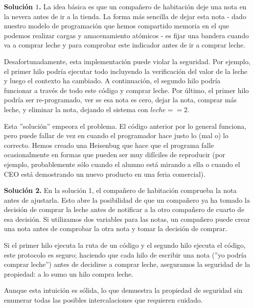 \documentclass[10pt]{book}
\begin{document}
\textbf{Solución $1$.} La idea básica es que un compañero de habitación deje una nota en la nevera antes de ir a la tienda. La forma más sencilla de dejar esta nota - dado nuestro modelo de programación que hemos compartido memoria en el que podemos realizar cargas y amacenamiento atómicos - es fijar una bandera cuando va a comprar leche y para comprobar este indicador antes de ir a comprar leche.

Desafortunadamente, esta implementación puede violar la seguridad. Por ejemplo, el primer hilo podría ejecutar todo incluyendo la verificación del valor de la leche y luego el contexto ha cambiado. A continuación, el segundo hilo podría funcionar a través de todo este código y comprar leche. Por último, el primer hilo podría ser re-programado, ver se esa nota es cero, dejar la nota, comprar más leche, y eliminar la nota, dejando el sistema con $leche == 2$.

Esta ''solución'' empeora el problema. El código anterior por lo general funciona, pero puede fallar de vez en cuando el programador hace justo lo (mal o) lo correcto. Hemos creado una Heisenbug que hace que el programa falle ocasionalmente en formas que pueden ser muy difíciles de reproducir (por ejemplo, probablemente sólo cuando el alumno está mirando a ella o cuando el CEO está demostrando un nuevo producto en una feria comercial).

\textbf{Solución 2.} En la solución 1, el compañero de habitación comprueba la nota antes de ajustarla. Esto abre la posibilidad de que un compañero ya ha tomado la decisión de comprar la leche antes de notificar a la otro compañero de cuarto de esa decisión. Si utilizamos dos variables para las notas, un compañero puede crear una nota antes de comprobar la otra nota y tomar la decisión de comprar.

Si el primer hilo ejecuta la ruta de un código y el segundo hilo ejecuta el código, este protocolo es seguro; haciendo que cada hilo de escribir una nota (''yo podría comprar leche'') antes de decidirse a comprar leche, aseguramos la seguridad de la propiedad: a lo sumo un hilo compra leche.

Aunque esta intuición es sólida, lo que demuestra la propiedad de seguridad sin enumerar todas las posibles intercalaciones que  requieren cuidado.
\end{document}
